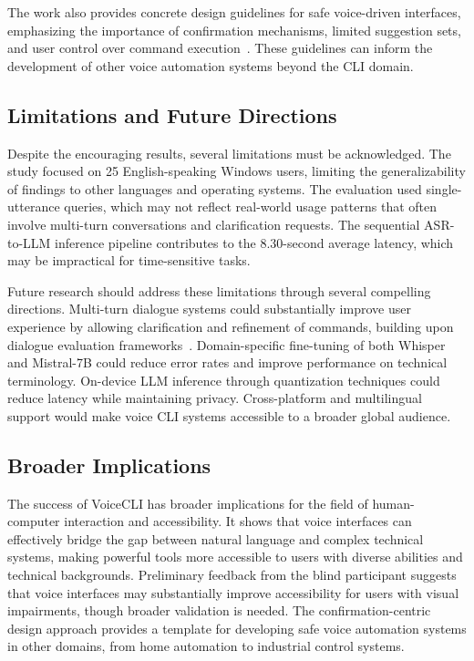 \documentclass[a4paper,12pt]{article}
\begin{document}
The work also provides concrete design guidelines for safe voice-driven interfaces, emphasizing the importance of confirmation mechanisms, limited suggestion sets, and user control over command execution~\cite{ref25}. These guidelines can inform the development of other voice automation systems beyond the CLI domain.

\subsection{Limitations and Future Directions}

Despite the encouraging results, several limitations must be acknowledged. The study focused on 25 English-speaking Windows users, limiting the generalizability of findings to other languages and operating systems. The evaluation used single-utterance queries, which may not reflect real-world usage patterns that often involve multi-turn conversations and clarification requests. The sequential ASR-to-LLM inference pipeline contributes to the 8.30-second average latency, which may be impractical for time-sensitive tasks.

Future research should address these limitations through several compelling directions. Multi-turn dialogue systems could substantially improve user experience by allowing clarification and refinement of commands, building upon dialogue evaluation frameworks~\cite{ref19}. Domain-specific fine-tuning of both Whisper and Mistral-7B could reduce error rates and improve performance on technical terminology. On-device LLM inference through quantization techniques could reduce latency while maintaining privacy. Cross-platform and multilingual support would make voice CLI systems accessible to a broader global audience.

\subsection{Broader Implications}

The success of VoiceCLI has broader implications for the field of human-computer interaction and accessibility. It shows that voice interfaces can effectively bridge the gap between natural language and complex technical systems, making powerful tools more accessible to users with diverse abilities and technical backgrounds. Preliminary feedback from the blind participant suggests that voice interfaces may substantially improve accessibility for users with visual impairments, though broader validation is needed. The confirmation-centric design approach provides a template for developing safe voice automation systems in other domains, from home automation to industrial control systems.
\end{document}
